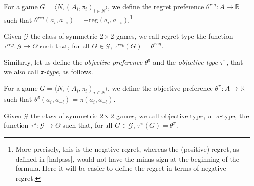 \documentclass[fleqn,reqno,11pt]{article}
\begin{document}

\begin{definition} \label{defn:regpref}

For a game $ G=\langle N, (A_i , \pi_i)_{i \in N} \rangle $, we define the regret preference $ \theta^{reg}: A \rightarrow \mathbb{R} $ such that $ \theta^{reg}(a_i,a_{-i})=-\text{reg}(a_i,a_{-i}) $.\footnote{More precisely, this is the negative regret, whereas the (positive) regret, as defined in [halpass], would not have the minus sign at the beginning of the formula. Here it will be easier to define the regret in terms of negative regret.}

\end{definition}



\begin{definition} \label{defn:regtype}

Given $ \mathcal{G} $ the class of symmetric $ 2 \times 2 $ games, we call regret type the function $\tau^{reg}: \mathcal{G} \rightarrow  \Theta$ such that, for all $G \in \mathcal{G}$, $ \tau^{reg}(G)= \theta^{reg}$.

\end{definition}

\noindent Similarly, let us define the \textit{objective preference} $\theta^{\pi}$ and the \textit{objective type} $ \tau^{\pi} $, that we also call $\pi$\textit{-type}, as follows. 

\begin{definition} \label{defn:objpref}

For a game $ G=\langle N, (A_i , \pi_i)_{i \in N} \rangle $, we define the objective preference $ \theta^{\pi}: A \rightarrow \mathbb{R} $ such that $ \theta^{\pi}(a_i,a_{-i})=\pi(a_i,a_{-i}) $.

\end{definition}


\begin{definition} \label{defn:objtype}

Given $ \mathcal{G} $ the class of symmetric $ 2 \times 2 $ games, we call objective type, or $\pi$-type, the function $\tau^{\pi}: \mathcal{G} \rightarrow  \Theta$ such that, for all $G \in \mathcal{G}$, $ \tau^{\pi}(G)= \theta^{\pi}$.

\end{definition}
\end{document}
